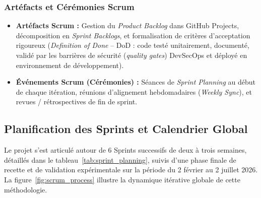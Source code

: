 \subsubsection{Art\'efacts et C\'er\'emonies Scrum}
\begin{itemize}
    \item \textbf{Art\'efacts Scrum :} Gestion du \textit{Product Backlog} dans GitHub Projects, d\'ecomposition en \textit{Sprint Backlogs}, et formalisation de crit\`eres d'acceptation rigoureux (\textit{Definition of Done} -- DoD : code test\'e unitairement, document\'e, valid\'e par les barri\`eres de s\'ecurit\'e (\textit{quality gates}) DevSecOps et d\'eploy\'e en environnement de d\'eveloppement).
    \item \textbf{\'Ev\'enements Scrum (C\'er\'emonies) :} S\'eances de \textit{Sprint Planning} au d\'ebut de chaque it\'eration, r\'eunions d'alignement hebdomadaires (\textit{Weekly Sync}), et revues / r\'etrospectives de fin de sprint.
\end{itemize}

\subsection{Planification des Sprints et Calendrier Global}
\par Le projet s'est articul\'e autour de 6 Sprints successifs de deux \`a trois semaines, d\'etaill\'es dans le tableau~\ref{tab:sprint_planning}, suivis d'une phase finale de recette et de validation exp\'erimentale sur la p\'eriode du 2 f\'evrier au 2 juillet 2026. La figure~\ref{fig:scrum_process} illustre la dynamique it\'erative globale de cette m\'ethodologie.


